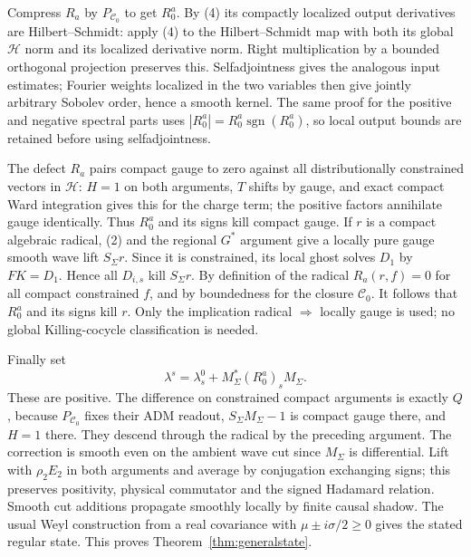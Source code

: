 \documentclass[11pt]{article}
\begin{document}
Compress $R_a$ by $P_{\mathcal C_0}$ to get $R_0^a$.
By (4) its compactly localized output derivatives are
Hilbert--Schmidt: apply (4) to the Hilbert--Schmidt map with both
its global $\mathcal H$ norm and its localized derivative norm.
Right multiplication by a bounded orthogonal projection preserves
this. Selfadjointness gives the analogous input estimates; Fourier
weights localized in the two variables then give jointly arbitrary
Sobolev order, hence a smooth kernel. The same proof for the positive
and negative spectral parts uses
$|R_0^a|=R_0^a\operatorname{sgn}(R_0^a)$, so local output
bounds are retained before using selfadjointness.

The defect $R_a$ pairs compact gauge to zero against all
distributionally constrained vectors in $\mathcal H$:
$H=1$ on both arguments, $T$ shifts by gauge, and exact compact
Ward integration gives this for the charge term; the positive
factors annihilate gauge identically. Thus $R_0^a$ and its signs
kill compact gauge. If $r$ is a compact algebraic radical,
(2) and the regional $G^*$ argument give a locally pure gauge
smooth wave lift $S_\Sigma r$. Since it is constrained, its
local ghost solves $D_1$ by $FK=D_1$. Hence all $D_{i,s}$ kill
$S_\Sigma r$. By definition of the radical $R_a(r,f)=0$ for all
compact constrained $f$, and by boundedness for the closure
$\mathcal C_0$. It follows that $R_0^a$ and its signs kill $r$.
Only the implication radical $\Rightarrow$ locally gauge is used;
no global Killing-cocycle classification is needed.

Finally set
\[
 \lambda^s=\lambda_s^0+M_\Sigma^*(R_0^a)_s M_\Sigma.
\]
These are positive. The difference on constrained compact arguments
is exactly $Q$, because $P_{\mathcal C_0}$ fixes their ADM readout,
$S_\Sigma M_\Sigma-1$ is compact gauge there, and $H=1$ there.
They descend through the radical by the preceding argument.
The correction is smooth even on the ambient wave cut since
$M_\Sigma$ is differential. Lift with $\rho_2E_2$ in both
arguments and average by conjugation exchanging signs; this
preserves positivity, physical commutator and the signed Hadamard
relation. Smooth cut additions propagate smoothly locally by finite
causal shadow. The usual Weyl construction from a real covariance
with $\mu\pm i\sigma/2\geq0$ gives the stated regular state.
This proves Theorem~\ref{thm:generalstate}.
\end{document}
